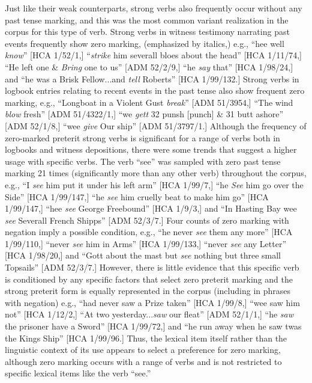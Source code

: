 Just like their weak counterparts, strong verbs also frequently occur without any past tense marking, and this was the most common variant realization in the corpus for this type of verb. Strong verbs in witness testimony narrating past events frequently show zero marking, (emphasized by italics,) e.g., “hee well \textit{know}” [HCA 1/52/1,] “\textit{strike} him severall bloes about the head” [HCA 1/11/74,] “He left one \&  \textit{Bring} one to us” [ADM 52/2/9,] “he \textit{say} that” [HCA 1/98/24,] and “he was a Brisk Fellow...and \textit{tell} Roberts” [HCA 1/99/132.] Strong verbs in logbook entries relating to recent events in the past tense also show frequent zero marking, e.g., “Longboat in a Violent Gust \textit{break}” [ADM 51/3954,] “The wind \textit{blow} fresh” [ADM 51/4322/1,] “we \textit{gett} 32 punsh [punch] \& 31 butt ashore” [ADM 52/1/8,] “wee \textit{give} Our ship” [ADM 51/3797/1.] Although the frequency of zero-marked preterit strong verbs is significant for a range of verbs both in logbooks and witness depositions, there were some trends that suggest a higher usage with specific verbs. The verb “see” was sampled with zero past tense marking 21 times (significantly more than any other verb) throughout the corpus, e.g., “I \textit{see} him put it under his left arm” [HCA 1/99/7,] “he \textit{See} him go over the Side” [HCA 1/99/147,] “he \textit{see} him cruelly beat to make him go” [HCA 1/99/147,] “hee \textit{see} George Freebound” [HCA 1/9/3,] and “In Hasting Bay wee \textit{see} Severall French Shipps” [ADM 52/3/7.] Four counts of zero marking with negation imply a possible condition, e.g., “he never \textit{see} them any more” [HCA 1/99/110,] “never \textit{see} him in Arms” [HCA 1/99/133,] “never \textit{see} any Letter” [HCA 1/98/20,] and “Gott about the mast but \textit{see} nothing but three small Topsails” [ADM 52/3/7.] However, there is little evidence that this specific verb is conditioned by any specific factors that select zero preterit marking and the strong preterit form is equally represented in the corpus (including in phrases with negation) e.g., “had never saw a Prize taken” [HCA 1/99/8,] “wee saw him not” [HCA 1/12/2,] “At two yesterday...\textit{saw} our fleat” [ADM 52/1/1,] “he \textit{saw} the prisoner have a Sword” [HCA 1/99/72,] and “he run away when he saw twas the Kings Ship” [HCA 1/99/96.] Thus, the lexical item itself rather than the linguistic context of its use appears to select a preference for zero marking, although zero marking occurs with a range of verbs and is not restricted to specific lexical items like the verb “see.”

